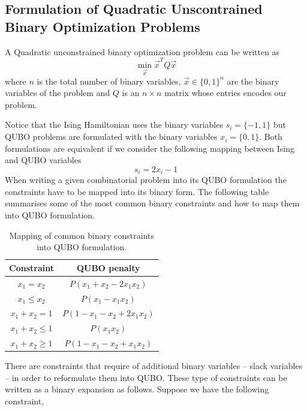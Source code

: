 \subsection{Formulation of Quadratic Unscontrained Binary Optimization Problems}
\begin{definition}
   A Quadratic unconstrained binary optimization problem can be written as
\begin{equation}
    \min_{\vec{x}}\vec{x}^{T}Q\vec{x}
\end{equation}
where $n$ is the total number of binary variables, $\vec{x}\in\{0,1\}^{n}$ are the binary variables of the problem and $Q$ is an $n\times n$ matrix whose entries encodes our problem.
\end{definition}
Notice that the Ising Hamiltonian uses the binary variables $s_{i} = \{-1,1\}$ but QUBO problems are formulated with the binary variables $x_{i} = \{0,1\}$. Both formulations are equivalent if we consider the following mapping between Ising and QUBO variables
\begin{equation}
\label{eq: ISING_QUBO}
    s_{i} = 2x_{i} -1
\end{equation}
When writing a given combinatorial problem into its QUBO formulation the constraints have to be mapped into its binary form. The following table summarises some of the most common binary constraints and how to map them into QUBO formulation.
\begin{table}[H]
\centering
\begin{tabular}{ |c||c| }
 \hline
 \textbf{Constraint} & \textbf{QUBO penalty} \\
 \hline
 $x_{1}=x_{2}$ & $P\left(x_{1} + x_{2} -2x_{1}x_{2}\right)$  \\
 $x_{1}\leq x_{2}$ &  $P\left(x_{1} -x_{1}x_{2}\right)$   \\
 $x_{1} + x_{2} = 1$ & $P\left(1-x_{1}-x_{2}+2x_{1}x_{2}\right)$ \\
 $x_{1} + x_{2} \leq 1$    & $P\left(x_{1}x_{2}\right)$ \\
$x_{1} + x_{2} \geq 1$ &   $P\left(1-x_{1}-x_{2}+x_{1}x_{2}\right)$ \\
 \hline
\end{tabular}
\caption{Mapping of common binary constraints into QUBO formulation.}
\end{table}
There are constraints that require of additional binary variables -- slack variables -- in order to reformulate them into QUBO. These type of constraints can be written as a binary expansion as follows. Suppose we have the following constraint,
